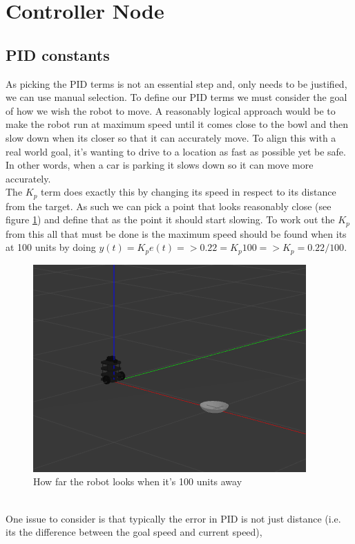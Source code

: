 \documentclass{article}
\newcommand\tab[1][1cm]{\hspace*{#1}}
\begin{document}
\newpage
\section{Controller Node}\label{controllerSection}
\subsection{PID constants}
As picking the PID terms is not an essential step and, only needs to be
justified, we can use manual selection. To define our PID terms we must consider
the goal of how we wish the robot to move. A reasonably logical approach would
be to make the robot run at maximum speed until it comes close to the bowl and
then slow down when its closer so that it can accurately move. To align this
with a real world goal, it's wanting to drive to a location as fast as possible
yet be safe. In other words, when a car is parking it slows down so it can move
more accurately.
\\
\tab The $K_p$ term does exactly this by changing its speed in respect to its
distance from the target. As such we can pick a point that looks reasonably
close (see figure \ref{100units}) and define that as the point it should start
slowing. To work out the $K_p$ from this all that must be done is the maximum
speed should be found when its at 100 units by doing $y(t)=K_pe(t) => 0.22 = K_p100 =>
K_p = 0.22/100$. 
\begin{figure}[ht]
    \centering
    \includegraphics[scale=0.75]{img/100_units_away.png}
    \caption{How far the robot looks when it's 100 units away}
    \label{100units}
\end{figure}
\\
\tab One issue to consider is that typically the error in PID is not just
distance (i.e. its the difference between the goal speed and current speed),
\end{document}
